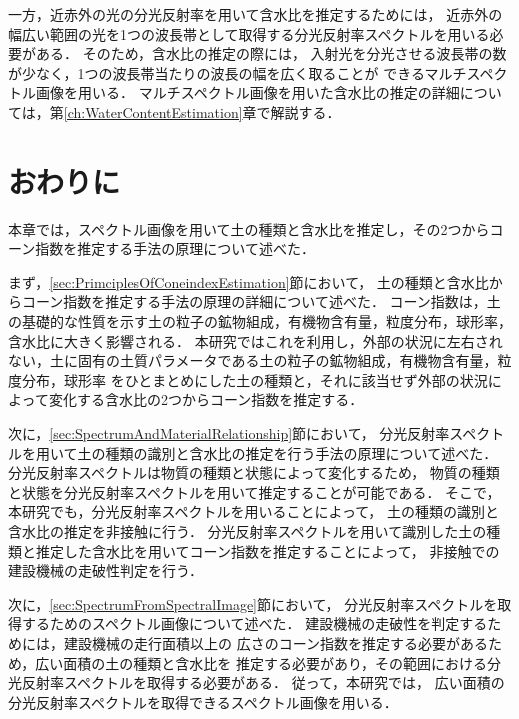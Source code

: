 一方，近赤外の光の分光反射率を用いて含水比を推定するためには，
近赤外の幅広い範囲の光を1つの波長帯として取得する分光反射率スペクトルを用いる必要がある．
そのため，含水比の推定の際には，%
入射光を分光させる波長帯の数が少なく，1つの波長帯当たりの波長の幅を広く取ることが
できるマルチスペクトル画像を用いる．
マルチスペクトル画像を用いた含水比の推定の詳細については，第\ref{ch:WaterContentEstimation}章で解説する．

\clearpage

\section{おわりに}

本章では，スペクトル画像を用いて土の種類と含水比を推定し，その2つからコーン指数を推定する手法の原理について述べた．

まず，\ref{sec:PrimciplesOfConeindexEstimation}節において，
土の種類と含水比からコーン指数を推定する手法の原理の詳細について述べた．%
コーン指数は，土の基礎的な性質を示す土の粒子の鉱物組成，有機物含有量，粒度分布，球形率，含水比に大きく影響される．
本研究ではこれを利用し，外部の状況に左右されない，土に固有の土質パラメータである土の粒子の鉱物組成，有機物含有量，粒度分布，球形率
をひとまとめにした土の種類と，それに該当せず外部の状況によって変化する含水比の2つからコーン指数を推定する．

次に，\ref{sec:SpectrumAndMaterialRelationship}節において，
分光反射率スペクトルを用いて土の種類の識別と含水比の推定を行う手法の原理について述べた．
分光反射率スペクトルは物質の種類と状態によって変化するため，
物質の種類と状態を分光反射率スペクトルを用いて推定することが可能である．
そこで，本研究でも，分光反射率スペクトルを用いることによって，
土の種類の識別と含水比の推定を非接触に行う．
分光反射率スペクトルを用いて識別した土の種類と推定した含水比を用いてコーン指数を推定することによって，
非接触での建設機械の走破性判定を行う．

次に，\ref{sec:SpectrumFromSpectralImage}節において，
分光反射率スペクトルを取得するためのスペクトル画像について述べた．
建設機械の走破性を判定するためには，建設機械の走行面積以上の
広さのコーン指数を推定する必要があるため，広い面積の土の種類と含水比を
推定する必要があり，その範囲における分光反射率スペクトルを取得する必要がある．
従って，本研究では，
広い面積の分光反射率スペクトルを取得できるスペクトル画像を用いる．

